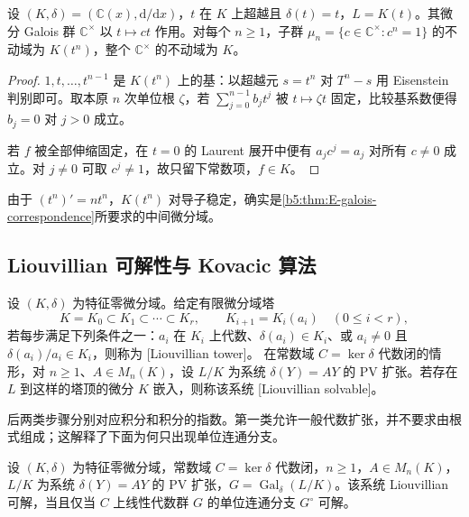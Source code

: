\begin{proposition}\label{b5:prop:E-exponential-fixed-field}
	设 \((K,\delta)=(\mathbb C(x),\mathrm d/\mathrm dx)\)，\(t\) 在 \(K\) 上超越且 \(\delta(t)=t\)，\(L=K(t)\)。其微分 Galois 群 \(\mathbb C^\times\) 以 \(t\mapsto ct\) 作用。对每个 \(n\ge1\)，子群 \(\mu_n=\{c\in\mathbb C^\times:c^n=1\}\) 的不动域为 \(K(t^n)\)，整个 \(\mathbb C^\times\) 的不动域为 \(K\)。
\end{proposition}
\begin{proof}
	\(1,t,\ldots,t^{n-1}\) 是 \(K(t^n)\) 上的基：以超越元 \(s=t^n\) 对 \(T^n-s\) 用 Eisenstein 判别即可。取本原 \(n\) 次单位根 \(\zeta\)，若 \(\sum_{j=0}^{n-1}b_jt^j\) 被 \(t\mapsto\zeta t\) 固定，比较基系数便得 \(b_j=0\) 对 \(j>0\) 成立。

	若 \(f\) 被全部伸缩固定，在 \(t=0\) 的 Laurent 展开中便有 \(a_jc^j=a_j\) 对所有 \(c\ne0\) 成立。对 \(j\ne0\) 可取 \(c^j\ne1\)，故只留下常数项，\(f\in K\)。
\end{proof}

由于 \((t^n)'=nt^n\)，\(K(t^n)\) 对导子稳定，确实是\cref{b5:thm:E-galois-correspondence}所要求的中间微分域。

\subsection{Liouvillian 可解性与 Kovacic 算法}
\label{b5:subsec:E03:03}

\begin{definition}\label{b5:def:E-liouvillian}
	设 \((K,\delta)\) 为特征零微分域。给定有限微分域塔
	\[
		K=K_0\subset K_1\subset\cdots\subset K_r,\qquad K_{i+1}=K_i(a_i)\quad(0\le i<r),
	\]
	若每步满足下列条件之一：\(a_i\) 在 \(K_i\) 上代数、\(\delta(a_i)\in K_i\)、或 \(a_i\ne0\) 且 \(\delta(a_i)/a_i\in K_i\)，则称为 [Liouvillian tower]。 在常数域 \(C=\ker\delta\) 代数闭的情形，对 \(n\ge1\)、\(A\in M_n(K)\)，设 \(L/K\) 为系统 \(\delta(Y)=AY\) 的 PV 扩张。若存在 \(L\) 到这样的塔顶的微分 \(K\) 嵌入，则称该系统 [Liouvillian solvable]。
\end{definition}

后两类步骤分别对应积分和积分的指数。第一类允许一般代数扩张，并不要求由根式组成；这解释了下面为何只出现单位连通分支。

\begin{theorem}\label{b5:thm:E-liouvillian-criterion}
	设 \((K,\delta)\) 为特征零微分域，常数域 \(C=\ker\delta\) 代数闭，\(n\ge1\)，\(A\in M_n(K)\)，\(L/K\) 为系统 \(\delta(Y)=AY\) 的 PV 扩张，\(G=\operatorname{Gal}_\delta(L/K)\)。该系统 Liouvillian 可解，当且仅当 \(C\) 上线性代数群 \(G\) 的单位连通分支 \(G^\circ\) 可解。
\end{theorem}

